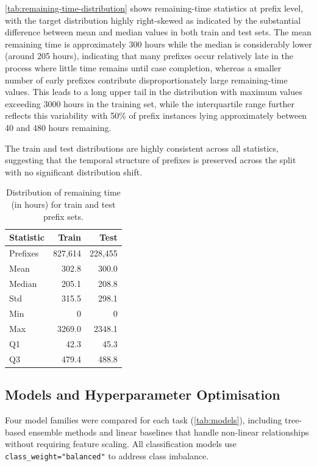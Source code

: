 \documentclass[runningheads]{llncs}
\begin{document}
\autoref{tab:remaining-time-distribution} shows remaining-time statistics at prefix level, with the target distribution highly right-skewed as indicated by the substantial difference between mean and median values in both train and test sets. The mean remaining time is approximately 300 hours while the median is considerably lower (around 205 hours), indicating that many prefixes occur relatively late in the process where little time remains until case completion, whereas a smaller number of early prefixes contribute disproportionately large remaining-time values. This leads to a long upper tail in the distribution with maximum values exceeding 3000 hours in the training set, while the interquartile range further reflects this variability with 50\% of prefix instances lying approximately between 40 and 480 hours remaining. 

The train and test distributions are highly consistent across all statistics, suggesting that the temporal structure of prefixes is preserved across the split with no significant distribution shift.

\begin{table}[H]
    \centering
    \caption{Distribution of remaining time (in hours) for train and test prefix sets.}
    \label{tab:remaining-time-distribution}
    \begin{tabular}{l r r}
        \toprule
        Statistic & Train & Test \\
        \midrule
        Prefixes & 827,614 & 228,455 \\
        Mean     & 302.8 & 300.0 \\
        Median   & 205.1 & 208.8 \\
        Std      & 315.5 & 298.1 \\
        Min      & 0   & 0 \\
        Max      & 3269.0 & 2348.1 \\
        Q1       & 42.3  & 45.3 \\
        Q3       & 479.4 & 488.8 \\
        \bottomrule
    \end{tabular}
\end{table}



\subsection{Models and Hyperparameter Optimisation}
\label{sec:model-list}

Four model families were compared for each task (\autoref{tab:models}),
including tree-based ensemble methods and linear baselines that handle
non-linear relationships without requiring feature scaling. All
classification models use \texttt{class\_weight="balanced"} to address class imbalance.
\end{document}
